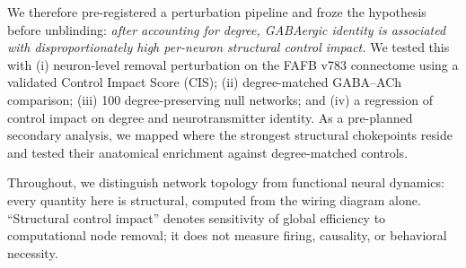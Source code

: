 We therefore pre-registered a perturbation pipeline and froze the
hypothesis before unblinding: \emph{after accounting for degree, GABAergic
identity is associated with disproportionately high per-neuron structural
control impact.} We tested this with (i) neuron-level removal
perturbation on the FAFB v783 connectome using a validated Control Impact
Score (CIS); (ii) degree-matched GABA--ACh comparison; (iii) 100
degree-preserving null networks; and (iv) a regression of control impact
on degree and neurotransmitter identity. As a pre-planned secondary
analysis, we mapped where the strongest structural chokepoints reside and
tested their anatomical enrichment against degree-matched controls.

Throughout, we distinguish network topology from functional neural
dynamics: every quantity here is structural, computed from the wiring
diagram alone. ``Structural control impact'' denotes sensitivity of
global efficiency to computational node removal; it does not measure
firing, causality, or behavioral necessity.
